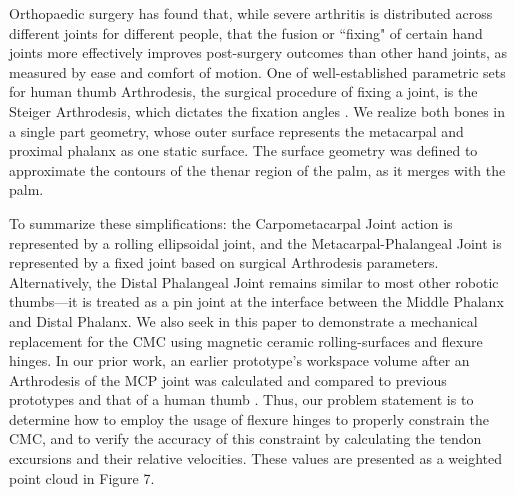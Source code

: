 \documentclass[letterpaper, 10 pt, conference]{ieeeconf}
\begin{document}
Orthopaedic surgery has found that, while severe arthritis is distributed across different joints for different people, that the fusion or ``fixing" of certain hand joints more effectively improves post-surgery outcomes than other hand joints, as measured by ease and comfort of motion. One of well-established parametric sets for human thumb Arthrodesis, the surgical procedure of fixing a joint, is the Steiger Arthrodesis, which dictates the fixation angles \cite{steiger}. We realize both bones in a single part geometry, whose outer surface represents the metacarpal and proximal phalanx as one static surface. The surface geometry was defined to approximate the contours of the thenar region of the palm, as it merges with the palm. 

To summarize these simplifications: the Carpometacarpal Joint action is represented by a rolling ellipsoidal joint, and the Metacarpal-Phalangeal Joint is represented by a fixed joint based on surgical Arthrodesis parameters. Alternatively, the Distal Phalangeal Joint remains similar to most other robotic thumbs---it is treated as a pin joint at the interface between the Middle Phalanx and Distal Phalanx. We also seek in this paper to demonstrate a mechanical replacement for the CMC using magnetic ceramic rolling-surfaces and flexure hinges. In our prior work, an earlier prototype's workspace volume after an Arthrodesis of the MCP joint was calculated and compared to previous prototypes and that of a human thumb \cite{biorob}. Thus, our problem statement is to determine how to employ the usage of flexure hinges to properly constrain the CMC, and to verify the accuracy of this constraint by calculating the tendon excursions and their relative velocities. These values are presented as a weighted point cloud in Figure 7. 
\end{document}
